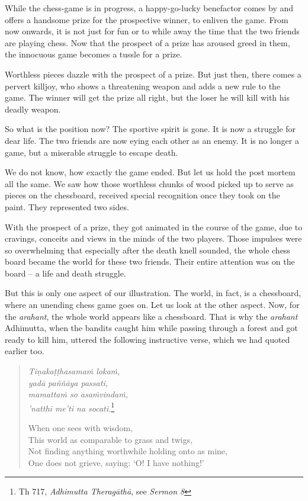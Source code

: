 While the chess-game is in progress, a happy-go-lucky benefactor comes by and offers a handsome prize for the prospective winner, to enliven the game. From now onwards, it is not just for fun or to while away the time that the two friends are playing chess. Now that the prospect of a prize has aroused greed in them, the innocuous game becomes a tussle for a prize.

Worthless pieces dazzle with the prospect of a prize. But just then, there comes a pervert killjoy, who shows a threatening weapon and adds a new rule to the game. The winner will get the prize all right, but the loser he will kill with his deadly weapon.

So what is the position now? The sportive spirit is gone. It is now a struggle for dear life. The two friends are now eying each other as an enemy. It is no longer a game, but a miserable struggle to escape death.

We do not know, how exactly the game ended. But let us hold the post mortem all the same. We saw how those worthless chunks of wood picked up to serve as pieces on the chessboard, received special recognition once they took on the paint. They represented two sides.

With the prospect of a prize, they got animated in the course of the game, due to cravings, conceits and views in the minds of the two players. Those impulses were so overwhelming that especially after the death knell sounded, the whole chess board became the world for these two friends. Their entire attention was on the board -- a life and death struggle.

But this is only one aspect of our illustration. The world, in fact, is a chessboard, where an unending chess game goes on. Let us look at the other aspect. Now, for the \emph{arahant}, the whole world appears like a chessboard. That is why the \emph{arahant} Adhimutta, when the bandits caught him while passing through a forest and got ready to kill him, uttered the following instructive verse, which we had quoted earlier too.

\begin{quote}
\emph{Tiṇakaṭṭhasamaṁ lokaṁ,}\\
\emph{yadā paññāya passati,}\\
\emph{mamattaṁ so asaṁvindaṁ,}\\
\emph{'natthi me'ti na socati.}\footnote{Th 717, \emph{Adhimutta Theragāthā}, see \emph{Sermon 8}}

When one sees with wisdom,\\
This world as comparable to grass and twigs,\\
Not finding anything worthwhile holding onto as mine,\\
One does not grieve, saying: `O! I have nothing!'
\end{quote}


